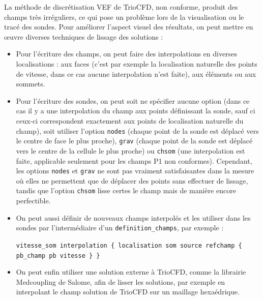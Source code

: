 La m\'ethode de discr\'etisation VEF de TrioCFD, non conforme, produit des champs tr\`es irr\'eguliers, ce qui pose un probl\`eme lors de la visualisation ou le trac\'e des sondes. Pour am\'eliorer l'aspect visuel des r\'esultats, on peut mettre en \oe{}uvre diverses techniques de lissage des solutions :

\begin{itemize}
	\item Pour l'\'ecriture des champs, on peut faire des interpolations en diverses localisations : aux faces (c'est par exemple la localisation naturelle des points de vitesse, dans ce cas aucune interpolation n'est faite), aux \'el\'ements ou aux sommets.
	
	\item Pour l'\'ecriture des sondes, on peut soit ne sp\'ecifier aucune option (dans ce cas il y a une interpolation du champ aux points d\'efinissant la sonde, sauf ci ceux-ci correspondent exactement aux points de localisation naturelle du champ), soit utiliser l'option \texttt{nodes} (chaque point de la sonde est d\'eplac\'e vers le centre de face le plus proche), \texttt{grav} (chaque point de la sonde est d\'eplac\'e vers le centre de la cellule le plus proche) ou \texttt{chsom} (une interpolation est faite, applicable seulement pour les champs P1 non conformes). Cependant, les options \texttt{nodes} et \texttt{grav} ne sont pas vraiment satisfaisantes dans la mesure o\`u elles ne permettent que de d\'eplacer des points sans effectuer de lissage, tandis que l'option \texttt{chsom} lisse certes le champ mais de mani\`ere encore perfectible.

	\item On peut aussi d\'efinir de nouveaux champs interpol\'es et les utiliser dans les sondes par l'interm\'ediaire d'un \texttt{definition\_champs}, par exemple :

\begin{center}
\texttt{vitesse\_som interpolation \{ localisation som source refchamp \{ pb\_champ pb vitesse \} \}}
\end{center}

	\item On peut enfin utiliser une solution externe \`a TrioCFD, comme la librairie Medcoupling de Salome, afin de lisser les solutions, par exemple en interpolant le champ solution de TrioCFD sur un maillage hexa\'edrique.
\end{itemize}


